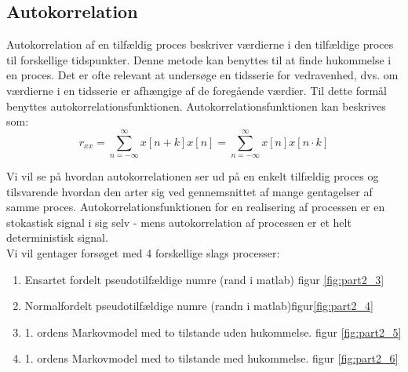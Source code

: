 \subsection{Autokorrelation}
Autokorrelation af en tilfældig proces beskriver værdierne i den tilfældige proces til forskellige tidspunkter. Denne metode kan benyttes til at finde hukommelse i en proces. 
Det er ofte relevant at undersøge en tidsserie for vedravenhed, dvs. om værdierne i en tidsserie er afhængige af de foregående værdier. Til dette formål benyttes autokorrelationsfunktionen.
Autokorrelationsfunktionen kan beskrives som:\\

\begin{equation}
r_{xx}=\sum_{n = - \infty}^{\infty}x[n+k]x[n]=\sum^{\infty}_{n = -\infty}x[n]x[n\cdot k] 
\end{equation}

Vi vil se på hvordan autokorrelationen ser ud på en enkelt tilfældig proces og tilsvarende hvordan den arter sig ved 
gennemsnittet af mange gentagelser af samme proces.
Autokorrelationsfunktionen for en realisering af processen er en stokastisk signal i sig selv - mens autokorrelation af processen er et helt deterministisk signal.\\


Vi vil gentager forsøget med 4 forskellige slags processer:  

\begin{enumerate}
	\item Ensartet fordelt pseudotilfældige numre (rand i matlab)   figur \ref{fig:part2_3}
	\item Normalfordelt pseudotilfældige numre (randn i matlab)figur\ref {fig:part2_4}
	\item 1. ordens Markovmodel med to tilstande uden hukommelse. figur \ref{fig:part2_5}
	\item 1. ordens Markovmodel med to tilstande med hukommelse. figur \ref{fig:part2_6} 
\end{enumerate}

